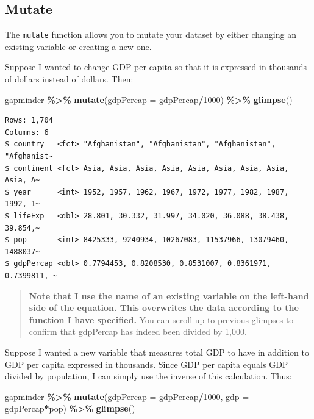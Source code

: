 \documentclass[
]{book}
\makeatletter
\newenvironment{Shaded}{\begin{snugshade}}{\end{snugshade}}
\newcommand{\AttributeTok}[1]{\textcolor[rgb]{0.27,0.27,0.27}{#1}}
\newcommand{\DecValTok}[1]{\textcolor[rgb]{0.06,0.06,0.06}{#1}}
\newcommand{\FunctionTok}[1]{\textcolor[rgb]{0.27,0.27,0.27}{\textbf{#1}}}
\newcommand{\NormalTok}[1]{#1}
\newcommand{\SpecialCharTok}[1]{\textcolor[rgb]{0.43,0.43,0.43}{\textbf{#1}}}
\newenvironment{kframe}{%
\medskip{}
\setlength{\fboxsep}{.8em}
 \def\at@end@of@kframe{}%
 \ifinner\ifhmode%
  \def\at@end@of@kframe{\end{minipage}}%
  \begin{minipage}{\columnwidth}%
 \fi\fi%
 \def\FrameCommand##1{\hskip\@totalleftmargin \hskip-\fboxsep
 \colorbox{shadecolor}{##1}\hskip-\fboxsep
     \hskip-\linewidth \hskip-\@totalleftmargin \hskip\columnwidth}%
 \MakeFramed {\advance\hsize-\width
   \@totalleftmargin\z@ \linewidth\hsize
   \@setminipage}}%
 {\par\unskip\endMakeFramed%
 \at@end@of@kframe}
\renewenvironment{Shaded}{\begin{kframe}}{\end{kframe}}
\makeatother
\begin{document}
\hypertarget{mutate}{%
\subsection{Mutate}\label{mutate}}

The \texttt{mutate} function allows you to mutate your dataset by either changing an existing variable or creating a new one.

Suppose I wanted to change GDP per capita so that it is expressed in thousands of dollars instead of dollars. Then:

\begin{Shaded}
\begin{Highlighting}[]
\NormalTok{gapminder }\SpecialCharTok{\%\textgreater{}\%} 
  \FunctionTok{mutate}\NormalTok{(}\AttributeTok{gdpPercap =}\NormalTok{ gdpPercap}\SpecialCharTok{/}\DecValTok{1000}\NormalTok{) }\SpecialCharTok{\%\textgreater{}\%} 
  \FunctionTok{glimpse}\NormalTok{()}
\end{Highlighting}
\end{Shaded}

\begin{verbatim}
Rows: 1,704
Columns: 6
$ country   <fct> "Afghanistan", "Afghanistan", "Afghanistan", "Afghanist~
$ continent <fct> Asia, Asia, Asia, Asia, Asia, Asia, Asia, Asia, Asia, A~
$ year      <int> 1952, 1957, 1962, 1967, 1972, 1977, 1982, 1987, 1992, 1~
$ lifeExp   <dbl> 28.801, 30.332, 31.997, 34.020, 36.088, 38.438, 39.854,~
$ pop       <int> 8425333, 9240934, 10267083, 11537966, 13079460, 1488037~
$ gdpPercap <dbl> 0.7794453, 0.8208530, 0.8531007, 0.8361971, 0.7399811, ~
\end{verbatim}

\begin{quote}
\textbf{Note that I use the name of an existing variable on the left-hand side of the equation. This overwrites the data according to the function I have specified.} You can scroll up to previous glimpses to confirm that gdpPercap has indeed been divided by 1,000.
\end{quote}

Suppose I wanted a new variable that measures total GDP to have in addition to GDP per capita expressed in thousands. Since GDP per capita equals GDP divided by population, I can simply use the inverse of this calculation. Thus:

\begin{Shaded}
\begin{Highlighting}[]
\NormalTok{gapminder }\SpecialCharTok{\%\textgreater{}\%} 
  \FunctionTok{mutate}\NormalTok{(}\AttributeTok{gdpPercap =}\NormalTok{ gdpPercap}\SpecialCharTok{/}\DecValTok{1000}\NormalTok{,}
         \AttributeTok{gdp =}\NormalTok{ gdpPercap}\SpecialCharTok{*}\NormalTok{pop) }\SpecialCharTok{\%\textgreater{}\%} 
  \FunctionTok{glimpse}\NormalTok{()}
\end{Highlighting}
\end{Shaded}
\end{document}
